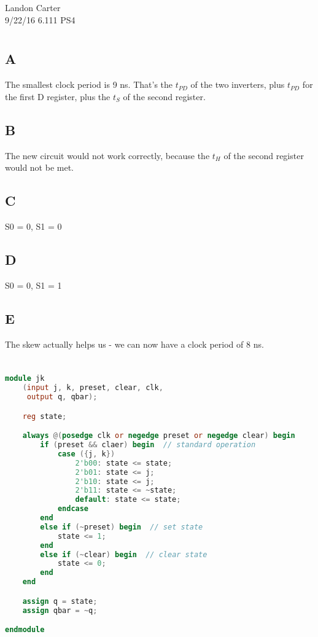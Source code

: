\documentclass[11pt,letterpaper]{article}
\begin{document}
\noindent Landon Carter \\
9/22/16
6.111 PS4

\section{}
\subsection{A}
The smallest clock period is 9 ns. That's the $t_{PD}$ of the two inverters, plus $t_{PD}$ for the first D register, plus the $t_S$ of the second register.

\subsection{B}
The new circuit would not work correctly, because the $t_H$ of the second register would not be met.

\subsection{C}
S0 = 0, S1 = 0

\subsection{D}
S0 = 0, S1 = 1

\subsection{E}
The skew actually helps us - we can now have a clock period of 8 ns.

\section{}

\begin{lstlisting}[language=Verilog]
module jk
	(input j, k, preset, clear, clk,
	 output q, qbar);

	reg state;

	always @(posedge clk or negedge preset or negedge clear) begin
		if (preset && claer) begin  // standard operation
			case ({j, k})
				2'b00: state <= state;
				2'b01: state <= j;
				2'b10: state <= j;
				2'b11: state <= ~state;
				default: state <= state;
			endcase
		end
		else if (~preset) begin  // set state
			state <= 1;
		end
		else if (~clear) begin  // clear state
			state <= 0;
		end
	end

	assign q = state;
	assign qbar = ~q;

endmodule
\end{lstlisting}
\end{document}
